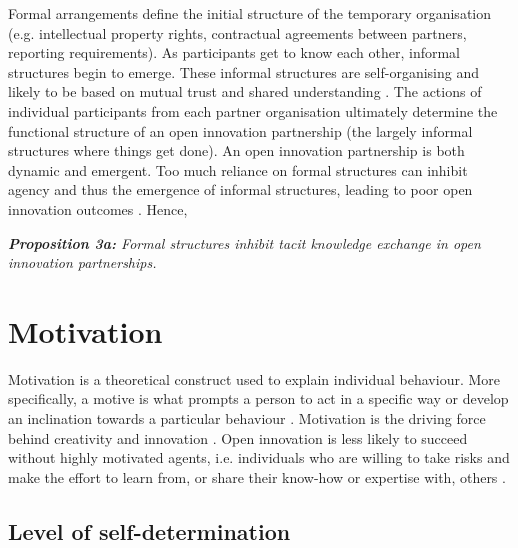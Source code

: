 Formal arrangements define the initial structure of the temporary organisation (e.g. intellectual property rights, contractual agreements between partners, reporting requirements). As participants get to know each other, informal structures begin to emerge. These informal structures are self-organising and likely to be based on mutual trust and shared understanding \citep{cross2001knowing,kleinbaum2007building,biancani2014semiformal,mcevily2014more}. The actions of individual participants from each partner organisation ultimately determine the functional structure of an open innovation partnership (the largely informal structures where things get done). An open innovation partnership is both dynamic and emergent. Too much reliance on formal structures can inhibit agency and thus the emergence of informal structures, leading to poor open innovation outcomes \citep{davis2010agency,biancani2014semiformal}. Hence, \bigskip

\begin{tcolorbox}
\textit{\textbf{Proposition 3a:} Formal structures inhibit tacit knowledge exchange in open innovation partnerships.}
\end{tcolorbox}

\section{Motivation}

Motivation is a theoretical construct used to explain individual behaviour. More specifically, a motive is what prompts a person to act in a specific way or develop an inclination towards a particular behaviour \citep{pardee1990motivation}. Motivation is the  driving force behind creativity and innovation \citep{amabile1988model,hennessey2010creativity}. Open innovation is less likely to succeed without highly motivated agents, i.e. individuals who are willing to take risks and make the effort to learn from, or share their know-how or expertise with, others \citep{nonaka1994dynamic,leonard1998role,bock2005behavioral}. \medskip

\subsection{Level of self-determination}

